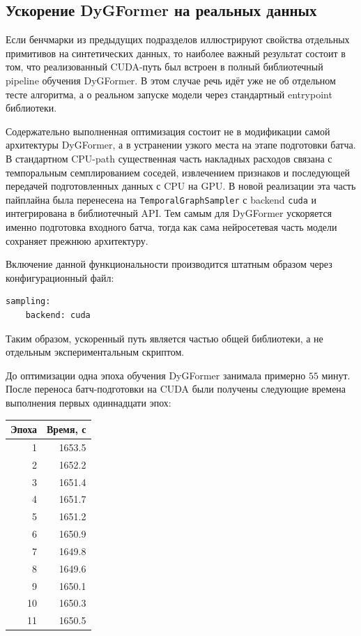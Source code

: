 \documentclass[a4paper,12pt]{extarticle}
\begin{document}
  \subsection{Ускорение DyGFormer на реальных данных}

  Если бенчмарки из предыдущих подразделов иллюстрируют свойства отдельных примитивов на синтетических данных, то наиболее важный результат состоит в том, что
  реализованный CUDA-путь был встроен в полный библиотечный pipeline обучения DyGFormer. В этом случае речь идёт уже не об отдельном тесте алгоритма, а о реальном
  запуске модели через стандартный entrypoint библиотеки.

  Содержательно выполненная оптимизация состоит не в модификации самой архитектуры DyGFormer, а в устранении узкого места на этапе подготовки батча. В стандартном
  CPU-path существенная часть накладных расходов связана с темпоральным семплированием соседей, извлечением признаков и последующей передачей подготовленных данных с
  CPU на GPU. В новой реализации эта часть пайплайна была перенесена на \texttt{TemporalGraphSampler} с backend \texttt{cuda} и интегрирована в библиотечный API. Тем
  самым для DyGFormer ускоряется именно подготовка входного батча, тогда как сама нейросетевая часть модели сохраняет прежнюю архитектуру.

  Включение данной функциональности производится штатным образом через конфигурационный файл:
  \begin{lstlisting}[basicstyle=\ttfamily\small,frame=single]
  sampling:
    backend: cuda
  \end{lstlisting}
  Таким образом, ускоренный путь является частью общей библиотеки, а не отдельным экспериментальным скриптом.

  До оптимизации одна эпоха обучения DyGFormer занимала примерно $55$ минут. После переноса батч-подготовки на CUDA были получены следующие времена выполнения первых одиннадцати эпох:
  \begin{center}
  \begin{tabular}{r r}
  \toprule
  Эпоха & Время, с \\
  \midrule
  1  & 1653.5 \\
  2  & 1652.2 \\
  3  & 1651.4 \\
  4  & 1651.7 \\
  5  & 1651.2 \\
  6  & 1650.9 \\
  7  & 1649.8 \\
  8  & 1649.6 \\
  9  & 1650.1 \\
  10 & 1650.3 \\
  11 & 1650.5 \\
  \bottomrule
  \end{tabular}
  \end{center}
\end{document}
